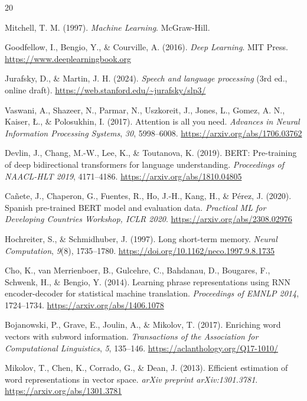 \documentclass[11pt,a4paper]{article}
\begin{document}
\begin{thebibliography}{20}

Mitchell, T. M. (1997). \textit{Machine Learning}. McGraw-Hill.

Goodfellow, I., Bengio, Y., \& Courville, A. (2016). \textit{Deep Learning}. MIT Press. \url{https://www.deeplearningbook.org}

Jurafsky, D., \& Martin, J. H. (2024). \textit{Speech and language processing} (3rd ed., online draft). \url{https://web.stanford.edu/~jurafsky/slp3/}

Vaswani, A., Shazeer, N., Parmar, N., Uszkoreit, J., Jones, L., Gomez, A. N., Kaiser, Ł., \& Polosukhin, I. (2017). Attention is all you need. \textit{Advances in Neural Information Processing Systems}, \textit{30}, 5998--6008. \url{https://arxiv.org/abs/1706.03762}

Devlin, J., Chang, M.-W., Lee, K., \& Toutanova, K. (2019). BERT: Pre-training of deep bidirectional transformers for language understanding. \textit{Proceedings of NAACL-HLT 2019}, 4171--4186. \url{https://arxiv.org/abs/1810.04805}

Cañete, J., Chaperon, G., Fuentes, R., Ho, J.-H., Kang, H., \& Pérez, J. (2020). Spanish pre-trained BERT model and evaluation data. \textit{Practical ML for Developing Countries Workshop, ICLR 2020}. \url{https://arxiv.org/abs/2308.02976}

Hochreiter, S., \& Schmidhuber, J. (1997). Long short-term memory. \textit{Neural Computation}, \textit{9}(8), 1735--1780. \url{https://doi.org/10.1162/neco.1997.9.8.1735}

Cho, K., van Merrienboer, B., Gulcehre, C., Bahdanau, D., Bougares, F., Schwenk, H., \& Bengio, Y. (2014). Learning phrase representations using RNN encoder-decoder for statistical machine translation. \textit{Proceedings of EMNLP 2014}, 1724--1734. \url{https://arxiv.org/abs/1406.1078}

Bojanowski, P., Grave, E., Joulin, A., \& Mikolov, T. (2017). Enriching word vectors with subword information. \textit{Transactions of the Association for Computational Linguistics}, \textit{5}, 135--146. \url{https://aclanthology.org/Q17-1010/}

Mikolov, T., Chen, K., Corrado, G., \& Dean, J. (2013). Efficient estimation of word representations in vector space. \textit{arXiv preprint arXiv:1301.3781}. \url{https://arxiv.org/abs/1301.3781}


\end{thebibliography}
\end{document}
